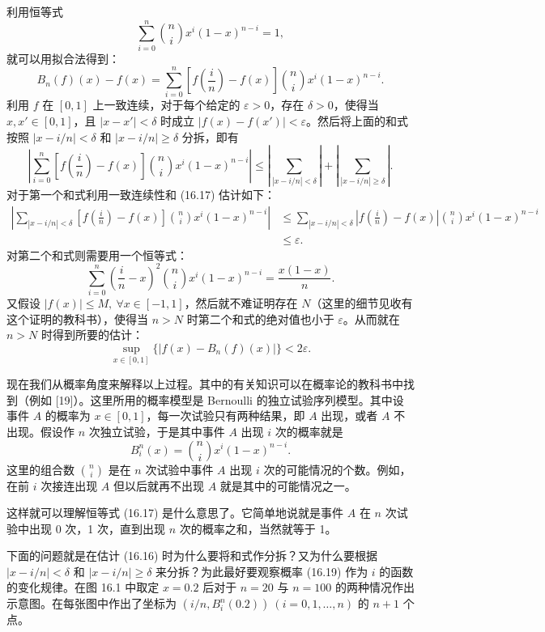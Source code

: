 利用恒等式
\begin{equation}
  \sum_{i=0}^n\binom ni x^i(1-x)^{n-i}=1,
\tag{16.17}
\label{eq:16.17}
\end{equation}
就可以用拟合法得到：
\[
  B_n(f)(x)-f(x)
  =\sum_{i=0}^n\left[f\left(\frac in\right)-f(x)\right]
   \binom ni x^i(1-x)^{n-i}.
\]
利用 $f$ 在 $[0,1]$ 上一致连续，对于每个给定的 $\varepsilon>0$，存在 $\delta>0$，使得当 $x,x'\in[0,1]$，且 $|x-x'|<\delta$ 时成立 $|f(x)-f(x')|<\varepsilon$。然后将上面的和式按照 $|x-i/n|<\delta$ 和 $|x-i/n|\geqslant\delta$ 分拆，即有
\[
\left|\sum_{i=0}^n\left[f\left(\frac in\right)-f(x)\right]\binom ni x^i(1-x)^{n-i}\right|
\leqslant\left|\sum_{|x-i/n|<\delta}\right|+
\left|\sum_{|x-i/n|\geqslant\delta}\right|.
\]
对于第一个和式利用一致连续性和 (16.17) 估计如下：
\[
\begin{aligned}
  \left|\sum_{|x-i/n|<\delta}\left[f\left(\frac in\right)-f(x)\right]
  \binom ni x^i(1-x)^{n-i}\right|
  &\leqslant\sum_{|x-i/n|<\delta}
  \left|f\left(\frac in\right)-f(x)\right|\binom ni x^i(1-x)^{n-i}\\
  &\leqslant\varepsilon.
\end{aligned}
\]
对第二个和式则需要用一个恒等式：
\begin{equation}
  \sum_{i=0}^n\left(\frac in-x\right)^2\binom ni x^i(1-x)^{n-i}
  =\frac{x(1-x)}n.
\tag{16.18}
\label{eq:16.18}
\end{equation}
又假设 $|f(x)|\leqslant M,\ \forall x\in[-1,1]$，然后就不难证明存在 $N$（这里的细节见收有这个证明的教科书），使得当 $n>N$ 时第二个和式的绝对值也小于 $\varepsilon$。从而就在 $n>N$ 时得到所要的估计：
\[
  \sup_{x\in[0,1]}\{|f(x)-B_n(f)(x)|\}<2\varepsilon.
\]

现在我们从概率角度来解释以上过程。其中的有关知识可以在概率论的教科书中找到（例如 [19]）。这里所用的概率模型是 Bernoulli 的独立试验序列模型。其中设事件 $A$ 的概率为 $x\in[0,1]$，每一次试验只有两种结果，即 $A$ 出现，或者 $A$ 不出现。假设作 $n$ 次独立试验，于是其中事件 $A$ 出现 $i$ 次的概率就是
\begin{equation}
  B_i^n(x)=\binom ni x^i(1-x)^{n-i}.
\tag{16.19}
\label{eq:16.19}
\end{equation}
这里的组合数 $\binom ni$ 是在 $n$ 次试验中事件 $A$ 出现 $i$ 次的可能情况的个数。例如，在前 $i$ 次接连出现 $A$ 但以后就再不出现 $A$ 就是其中的可能情况之一。

这样就可以理解恒等式 (16.17) 是什么意思了。它简单地说就是事件 $A$ 在 $n$ 次试验中出现 0 次，1 次，直到出现 $n$ 次的概率之和，当然就等于 1。

下面的问题就是在估计 (16.16) 时为什么要将和式作分拆？又为什么要根据 $|x-i/n|<\delta$ 和 $|x-i/n|\geqslant\delta$ 来分拆？为此最好要观察概率 (16.19) 作为 $i$ 的函数的变化规律。在图 16.1 中取定 $x=0.2$ 后对于 $n=20$ 与 $n=100$ 的两种情况作出示意图。在每张图中作出了坐标为 $(i/n,B_i^n(0.2))\ (i=0,1,\ldots,n)$ 的 $n+1$ 个点。


